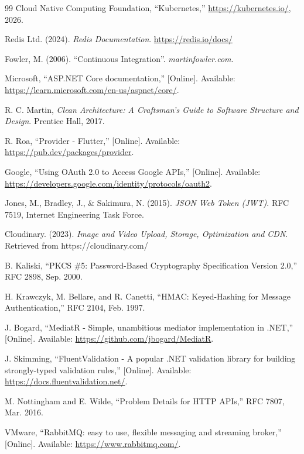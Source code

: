 \begin{thebibliography}{99}
Cloud Native Computing Foundation, ``Kubernetes,'' \url{https://kubernetes.io/}, 2026.

Redis Ltd. (2024). \textit{Redis Documentation}. \url{https://redis.io/docs/}

Fowler, M. (2006). ``Continuous Integration''. \textit{martinfowler.com}.

Microsoft, ``ASP.NET Core documentation,'' [Online]. Available: \url{https://learn.microsoft.com/en-us/aspnet/core/}.

R. C. Martin, \emph{Clean Architecture: A Craftsman's Guide to Software Structure and Design}. Prentice Hall, 2017.

R. Roa, ``Provider - Flutter,'' [Online]. Available: \url{https://pub.dev/packages/provider}.

Google, ``Using OAuth 2.0 to Access Google APIs,'' [Online]. Available: \url{https://developers.google.com/identity/protocols/oauth2}.

Jones, M., Bradley, J., \& Sakimura, N. (2015). \textit{JSON Web Token (JWT)}. RFC 7519, Internet Engineering Task Force.

Cloudinary. (2023). \textit{Image and Video Upload, Storage, Optimization and CDN}. Retrieved from https://cloudinary.com/

B. Kaliski, ``PKCS \#5: Password-Based Cryptography Specification Version 2.0,'' RFC 2898, Sep. 2000.

H. Krawczyk, M. Bellare, and R. Canetti, ``HMAC: Keyed-Hashing for Message Authentication,'' RFC 2104, Feb. 1997.

J. Bogard, ``MediatR - Simple, unambitious mediator implementation in .NET,'' [Online]. Available: \url{https://github.com/jbogard/MediatR}.

J. Skimming, ``FluentValidation - A popular .NET validation library for building strongly-typed validation rules,'' [Online]. Available: \url{https://docs.fluentvalidation.net/}.

M. Nottingham and E. Wilde, ``Problem Details for HTTP APIs,'' RFC 7807, Mar. 2016.

VMware, ``RabbitMQ: easy to use, flexible messaging and streaming broker,'' [Online]. Available: \url{https://www.rabbitmq.com/}.


\end{thebibliography}

